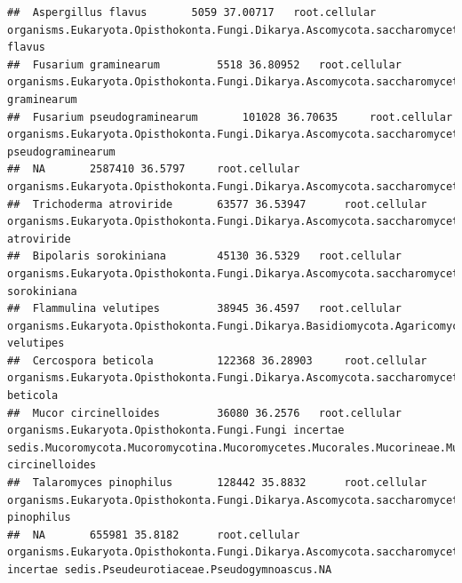 \documentclass{article}\usepackage[]{graphicx}\usepackage[]{color}
\makeatletter
\newenvironment{kframe}{%
 \def\at@end@of@kframe{}%
 \ifinner\ifhmode%
  \def\at@end@of@kframe{\end{minipage}}%
  \begin{minipage}{\columnwidth}%
 \fi\fi%
 \def\FrameCommand##1{\hskip\@totalleftmargin \hskip-\fboxsep
 \colorbox{shadecolor}{##1}\hskip-\fboxsep
     \hskip-\linewidth \hskip-\@totalleftmargin \hskip\columnwidth}%
 \MakeFramed {\advance\hsize-\width
   \@totalleftmargin\z@ \linewidth\hsize
   \@setminipage}}%
 {\par\unskip\endMakeFramed%
 \at@end@of@kframe}
\newenvironment{knitrout}{}{} %
\makeatother
\begin{document}
\begin{knitrout}
\begin{kframe}
\begin{verbatim}
##  Aspergillus flavus 		 5059 37.00717 	 root.cellular organisms.Eukaryota.Opisthokonta.Fungi.Dikarya.Ascomycota.saccharomyceta.Pezizomycotina.leotiomyceta.Eurotiomycetes.Eurotiomycetidae.Eurotiales.Aspergillaceae.Aspergillus.Circumdati.Aspergillus flavus
##  Fusarium graminearum 		 5518 36.80952 	 root.cellular organisms.Eukaryota.Opisthokonta.Fungi.Dikarya.Ascomycota.saccharomyceta.Pezizomycotina.leotiomyceta.sordariomyceta.Sordariomycetes.Hypocreomycetidae.Hypocreales.Nectriaceae.Fusarium.NA.Fusarium graminearum
##  Fusarium pseudograminearum 		 101028 36.70635 	 root.cellular organisms.Eukaryota.Opisthokonta.Fungi.Dikarya.Ascomycota.saccharomyceta.Pezizomycotina.leotiomyceta.sordariomyceta.Sordariomycetes.Hypocreomycetidae.Hypocreales.Nectriaceae.Fusarium.NA.Fusarium pseudograminearum
##  NA 		 2587410 36.5797 	 root.cellular organisms.Eukaryota.Opisthokonta.Fungi.Dikarya.Ascomycota.saccharomyceta.Pezizomycotina.leotiomyceta.sordariomyceta.Sordariomycetes.Sordariomycetidae.Sordariales.Chaetomiaceae.NA.NA
##  Trichoderma atroviride 		 63577 36.53947 	 root.cellular organisms.Eukaryota.Opisthokonta.Fungi.Dikarya.Ascomycota.saccharomyceta.Pezizomycotina.leotiomyceta.sordariomyceta.Sordariomycetes.Hypocreomycetidae.Hypocreales.Hypocreaceae.Trichoderma.Trichoderma atroviride
##  Bipolaris sorokiniana 		 45130 36.5329 	 root.cellular organisms.Eukaryota.Opisthokonta.Fungi.Dikarya.Ascomycota.saccharomyceta.Pezizomycotina.leotiomyceta.dothideomyceta.Dothideomycetes.Pleosporomycetidae.Pleosporales.Pleosporineae.Pleosporaceae.Bipolaris.Bipolaris sorokiniana
##  Flammulina velutipes 		 38945 36.4597 	 root.cellular organisms.Eukaryota.Opisthokonta.Fungi.Dikarya.Basidiomycota.Agaricomycotina.Agaricomycetes.Agaricomycetidae.Agaricales.Physalacriaceae.Flammulina.Flammulina velutipes
##  Cercospora beticola 		 122368 36.28903 	 root.cellular organisms.Eukaryota.Opisthokonta.Fungi.Dikarya.Ascomycota.saccharomyceta.Pezizomycotina.leotiomyceta.dothideomyceta.Dothideomycetes.Dothideomycetidae.Capnodiales.Mycosphaerellaceae.Cercospora.Cercospora beticola
##  Mucor circinelloides 		 36080 36.2576 	 root.cellular organisms.Eukaryota.Opisthokonta.Fungi.Fungi incertae sedis.Mucoromycota.Mucoromycotina.Mucoromycetes.Mucorales.Mucorineae.Mucoraceae.Mucor.Mucor circinelloides
##  Talaromyces pinophilus 		 128442 35.8832 	 root.cellular organisms.Eukaryota.Opisthokonta.Fungi.Dikarya.Ascomycota.saccharomyceta.Pezizomycotina.leotiomyceta.Eurotiomycetes.Eurotiomycetidae.Eurotiales.Trichocomaceae.Talaromyces.Talaromyces pinophilus
##  NA 		 655981 35.8182 	 root.cellular organisms.Eukaryota.Opisthokonta.Fungi.Dikarya.Ascomycota.saccharomyceta.Pezizomycotina.leotiomyceta.sordariomyceta.Leotiomycetes.Leotiomycetes incertae sedis.Pseudeurotiaceae.Pseudogymnoascus.NA

\end{verbatim}
\end{kframe}
\end{knitrout}
\end{document}
